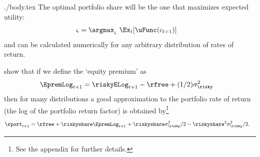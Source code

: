 \documentclass{\handout}
\begin{document}
\begin{verbatimwrite}{./body.tex}
The optimal portfolio share will be the one that maximizes expected utility:
\begin{equation}\begin{gathered}\begin{aligned}
  \varsigma & =  \argmax_{\varsigma} ~ \Ex_{t}[\uFunc(c_{t+1})]
\end{aligned}\end{gathered}\end{equation}
and can be calculated numerically for any arbitrary distribution of rates of return.

\cite{cvAppendix} show that if we define the `equity premium' as
\begin{equation}\begin{gathered}\begin{aligned}
  \EpremLog_{t+1} & =  \riskyELog_{t+1}-\rfree + (1/2)\sigma^{2}_{\risky} \label{eq:eprem}
\end{aligned}\end{gathered}\end{equation}
then for many distributions a good approximation to the portfolio rate of return (the log of the portfolio return factor) is obtained by\footnote{See the appendix for further details.}
\begin{equation}\begin{gathered}\begin{aligned}
  \rport_{t+1} & =  \rfree+ \riskyshare \EpremLog_{t+1}+\riskyshare \sigma^{2}_{\risky}/2 - \riskyshare^{2}\sigma^{2}_{\risky}/2 \label{eq:rportCV}.
\end{aligned}\end{gathered}\end{equation}


\end{verbatimwrite}
\end{document}
